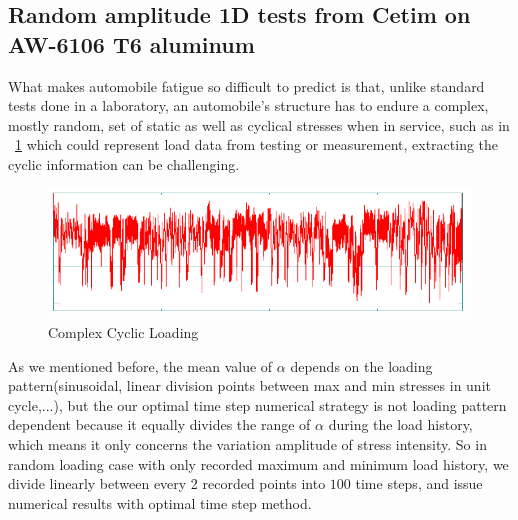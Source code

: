 \documentclass[3p,times,number,review]{elsarticle}
\newcommand{\figref}[1]{\figurename~\ref{#1}}
\begin{document}
\newpage
\subsection{Random amplitude 1D tests from Cetim on AW-6106 T6 aluminum}

What makes automobile fatigue so difficult to predict is that, unlike standard tests done in a laboratory, an automobile's structure has to endure a complex, mostly random, set of static as well as cyclical stresses when in service, such as in \figref{complexloading} which could represent load data from testing or measurement, extracting the cyclic information can be challenging. 
\begin{figure}[h!]
	\centering
	\includegraphics[width=\textwidth]{figures//complexloading.png} 
	\caption{Complex Cyclic Loading}
	\label{complexloading}
\end{figure}

As we mentioned before, the mean value of $\alpha$ depends on the loading pattern(sinusoidal, linear division points between max and min stresses in unit cycle,...), but the our optimal time step numerical strategy is not loading pattern dependent because it equally divides the range of $\alpha$ during the load history, which means it only concerns the variation amplitude of stress intensity. So in random loading case with only recorded maximum and minimum load history, we divide linearly between every 2 recorded points into $100$ time steps, and issue numerical results with optimal time step method.
\end{document}

